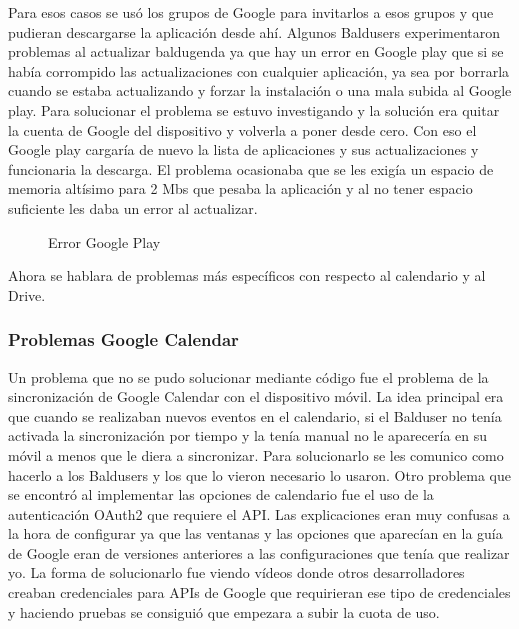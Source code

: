 Para esos casos se usó los grupos de Google para invitarlos a esos grupos y que pudieran descargarse la aplicación desde ahí.
Algunos Baldusers experimentaron problemas al actualizar baldugenda ya que hay un error en Google play que si se había corrompido las actualizaciones con cualquier aplicación, ya sea por borrarla cuando se estaba actualizando  y forzar la instalación o una mala subida al Google play. 
Para solucionar el problema se estuvo investigando y la solución era quitar la cuenta de Google del dispositivo y volverla a poner desde cero.
Con eso el Google play cargaría de nuevo la lista de aplicaciones y sus actualizaciones y funcionaria la descarga.
El problema ocasionaba que se les exigía un espacio de memoria altísimo para 2 Mbs que pesaba la aplicación y al no tener espacio suficiente les daba un error al actualizar.

\begin{figure}[H] 
  \begin{center} 
    \caption{Error Google Play} 
    \label{fig:ErrorGoogle} 
  \end{center} 
\end{figure}

Ahora se hablara de problemas más específicos con respecto al calendario y al Drive.

\subsubsection{Problemas Google Calendar}
\label{subsubsecc:Problemas Google Calendar}

Un problema que no se pudo solucionar mediante código fue el problema de la sincronización de Google Calendar con el dispositivo móvil. La idea principal era que cuando se realizaban nuevos eventos en el calendario, si el Balduser no tenía activada la sincronización por tiempo y la tenía manual no le aparecería en su móvil a menos que le diera a sincronizar.
Para solucionarlo se les comunico como hacerlo a los Baldusers y los que lo vieron necesario lo usaron.
Otro problema que se encontró al implementar las opciones de calendario fue el uso de la autenticación OAuth2 que requiere el API.
Las explicaciones eran muy confusas a la hora de configurar ya que las ventanas y las opciones que aparecían en la guía de Google eran de versiones anteriores a las configuraciones que tenía que realizar yo.
La forma de solucionarlo fue viendo vídeos donde otros desarrolladores creaban credenciales para APIs de Google que requirieran ese tipo de credenciales y haciendo pruebas se consiguió que empezara a subir la cuota de uso.

